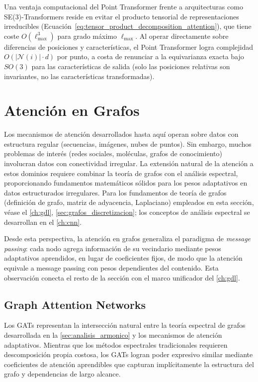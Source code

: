Una ventaja computacional del Point \gls{Transformer} frente a arquitecturas como SE(3)-\glspl{Transformer} reside en evitar el producto tensorial de representaciones irreducibles (Ecuación~\eqref{eq:tensor_product_decomposition_attention}), que tiene coste $O(\ell_{\max}^3)$ para grado máximo $\ell_{\max}$. Al operar directamente sobre diferencias de posiciones y características, el Point \gls{Transformer} logra complejidad $O(|\mathcal{N}(i)| \cdot d)$ por punto, a costa de renunciar a la equivarianza exacta bajo $SO(3)$ para las características de salida (solo las posiciones relativas son invariantes, no las características transformadas).

\section{Atención en Grafos}

Los mecanismos de atención desarrollados hasta aquí operan sobre datos con estructura regular (secuencias, imágenes, nubes de puntos). Sin embargo, muchos problemas de interés (redes sociales, moléculas, grafos de conocimiento) involucran datos con conectividad irregular. La extensión natural de la atención a estos dominios requiere combinar la teoría de grafos con el análisis espectral, proporcionando fundamentos matemáticos sólidos para los pesos adaptativos en datos estructurados irregulares. Para los fundamentos de teoría de grafos (definición de grafo, matriz de adyacencia, Laplaciano) empleados en esta sección, véase el \autoref{ch:gdl}, \autoref{sec:grafos_discretizacion}; los conceptos de análisis espectral se desarrollan en el \autoref{ch:cnn}.

Desde esta perspectiva, la atención en grafos generaliza el paradigma de \textit{message passing}: cada nodo agrega información de su vecindario mediante pesos adaptativos aprendidos, en lugar de coeficientes fijos, de modo que la atención equivale a message passing con pesos dependientes del contenido. Esta observación conecta el resto de la sección con el marco unificador del \autoref{ch:gdl}.

\subsection{Graph Attention Networks}\label{subsec:graph_attention_networks}\label{sec:graph_attention}

Los \glspl{GAT} representan la intersección natural entre la teoría espectral de grafos desarrollada en la \autoref{sec:analisis_armonico} y los mecanismos de atención adaptativos. Mientras que los métodos espectrales tradicionales requieren descomposición propia costosa, los \glspl{GAT} logran poder expresivo similar mediante coeficientes de atención aprendibles que capturan implícitamente la estructura del grafo y dependencias de largo alcance.

